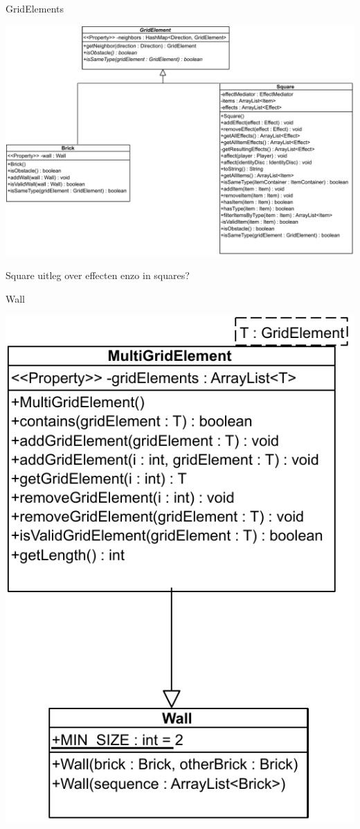 \documentclass[11pt,t]{beamer}
\begin{document}
\begin{frame}{GridElements}
\begin{center}
\includegraphics[scale=0.35]{images/gridelements}
\end{center}
\end{frame}


\begin{frame}{Square}
uitleg over effecten enzo in squares?
\end{frame}

\begin{frame}{Wall}
\begin{center}
\includegraphics[scale=0.4]{images/wall}
\end{center}
\end{frame}
\end{document}

